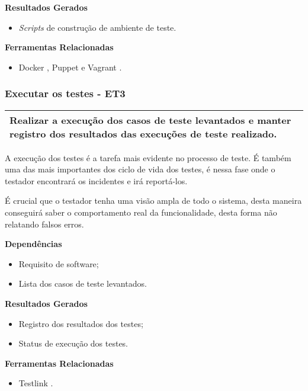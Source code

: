 \textbf{Resultados Gerados}
\begin{itemize}
    \item \textit{Scripts} de construção de ambiente de teste.
\end{itemize}

\textbf{Ferramentas Relacionadas}
\begin{itemize}
    \item Docker \cite{Docker}, Puppet \cite{Puppet} e Vagrant \cite{Vagrant}.
\end{itemize}


\subsubsection{Executar os testes - ET3}
\label{sec:et3}

\begin{table}[!ht]
\centering
\begin{tabular}{|p{130mm}|}
\hline
Realizar a execução dos casos de teste levantados e manter registro dos resultados das execuções de teste realizado. \\ 
\hline
\end{tabular}
\end{table}

A execução dos testes é a tarefa mais evidente no processo de teste. É também uma das mais importantes dos ciclo de vida dos testes, é nessa fase onde o testador encontrará os incidentes e irá reportá-los.

É crucial que o testador tenha uma visão ampla de todo o sistema, desta maneira conseguirá saber o comportamento real da funcionalidade, desta forma não relatando falsos erros.

\textbf{Dependências}
\begin{itemize}
    \item Requisito de software;
    \item Lista dos casos de teste levantados.
\end{itemize}

\textbf{Resultados Gerados}
\begin{itemize}
    \item Registro dos resultados dos testes;
    \item Status de execução dos testes.
\end{itemize}

\textbf{Ferramentas Relacionadas}
\begin{itemize}
    \item Testlink \cite{TestLink}.
\end{itemize}


